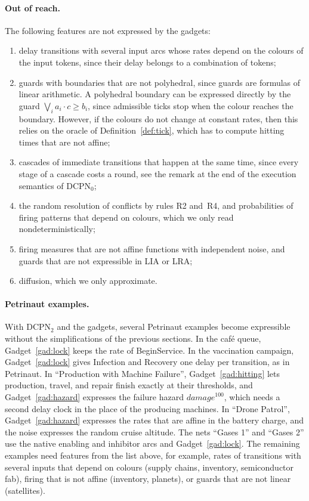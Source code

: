 \documentclass[11pt]{article}
\theoremstyle{definition}
\newcommand{\DCPN}[1]{\texorpdfstring{\textup{DCPN}\ensuremath{_{#1}}}{DCPN#1}}
\begin{document}
\paragraph{Out of reach.}
The following features are not expressed by the gadgets:
\begin{enumerate}
  \item delay transitions with several input arcs whose rates depend on the
    colours of the input tokens, since their delay belongs to a combination
    of tokens;
  \item guards with boundaries that are not polyhedral, since guards are
    formulas of linear arithmetic. A polyhedral boundary can be expressed
    directly by the guard $\bigvee_i a_i \cdot c \ge b_i$, since admissible
    ticks stop when the colour reaches the boundary. However, if the colours
    do not change at constant rates, then this relies on the oracle of
    Definition~\ref{def:tick}, which has to compute hitting times that are
    not affine;
  \item cascades of immediate transitions that happen at the same time, since
    every stage of a cascade costs a round, see the remark at the end of the
    execution semantics of \DCPN{0};
  \item the random resolution of conflicts by rules R2 and~R4, and
    probabilities of firing patterns that depend on colours, which we only
    read nondeterministically;
  \item firing measures that are not affine functions with independent noise,
    and guards that are not expressible in LIA or LRA;
  \item diffusion, which we only approximate.
\end{enumerate}

\paragraph{Petrinaut examples.}
With \DCPN{2} and the gadgets, several Petrinaut examples become expressible
without the simplifications of the previous sections. In the café queue,
Gadget~\ref{gad:lock} keeps the rate of BeginService. In the vaccination
campaign, Gadget~\ref{gad:lock} gives Infection and Recovery one delay per
transition, as in Petrinaut. In ``Production with Machine Failure'',
Gadget~\ref{gad:hitting} lets production, travel, and repair finish exactly
at their thresholds, and Gadget~\ref{gad:hazard} expresses the failure
hazard $\mathit{damage}^{100}$, which needs a second delay clock in the
place of the producing machines. In ``Drone Patrol'', Gadget~\ref{gad:hazard}
expresses the rates that are affine in the battery charge, and the noise
expresses the random cruise altitude. The nets ``Gases 1'' and ``Gases 2''
use the native enabling and inhibitor arcs and Gadget~\ref{gad:lock}. The
remaining examples need features from the list above, for example, rates of
transitions with several inputs that depend on colours (supply chains,
inventory, semiconductor fab), firing that is not affine (inventory,
planets), or guards that are not linear (satellites).



\end{document}
